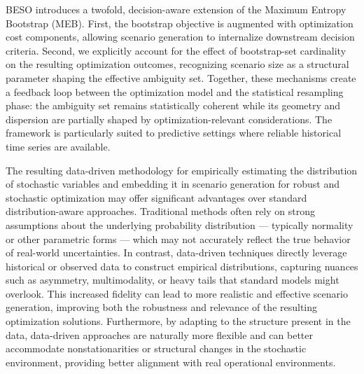 \documentclass[a4paper,fleqn,3p,11pt,authoryear]{cas-sc}
\begin{document}
BESO introduces a twofold, decision-aware extension of the Maximum Entropy Bootstrap (MEB). First, the bootstrap objective is augmented with optimization cost components, allowing scenario generation to internalize downstream decision criteria. Second, we explicitly account for the effect of bootstrap-set cardinality on the resulting optimization outcomes, recognizing scenario size as a structural parameter shaping the effective ambiguity set. Together, these mechanisms create a feedback loop between the optimization model and the statistical resampling phase: the ambiguity set remains statistically coherent while its geometry and dispersion are partially shaped by optimization-relevant considerations. The framework is particularly suited to predictive settings where reliable historical time series are available.

The resulting data-driven methodology for empirically estimating the distribution of stochastic variables and embedding it in scenario generation for robust and stochastic optimization may offer significant advantages over standard distribution-aware approaches. Traditional methods often rely on strong assumptions about the underlying probability distribution — typically normality or other parametric forms — which may not accurately reflect the true behavior of real-world uncertainties. In contrast, data-driven techniques directly leverage historical or observed data to construct empirical distributions, capturing nuances such as asymmetry, multimodality, or heavy tails that standard models might overlook. This increased fidelity can lead to more realistic and effective scenario generation, improving both the robustness and relevance of the resulting optimization solutions. Furthermore, by adapting to the structure present in the data, data-driven approaches are naturally more flexible and can better accommodate nonstationarities or structural changes in the stochastic environment, providing better alignment with real operational environments.

\end{document}
